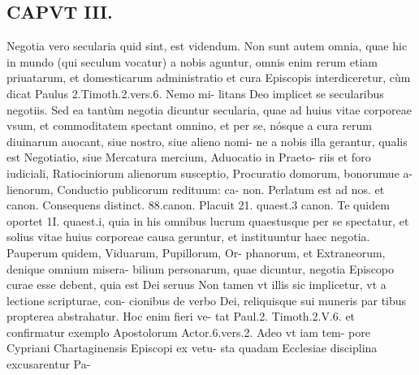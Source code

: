 \documentclass{article}
\begin{document}
\begin{pages}
\section*{CAPVT  III. }
\marginpar{[ p.149 ]}\pstart Negotia vero secularia quid sint, est videndum. Non sunt autem omnia, quae hic in mundo (qui seculum vocatur) a nobis aguntur, omnis enim rerum etiam priuatarum, et domesticarum administratio et cura Episcopis interdiceretur, cùm dicat Paulus 2.Timoth.2.vers.6. Nemo mi- litans Deo implicet se secularibus negotiis. Sed ea tantùm negotia dicuntur secularia, quae ad huius vitae corporeae vsum, et commoditatem spectant omnino, et per se, nósque a cura rerum diuinarum auocant, siue nostro, siue alieno nomi- ne a nobis illa gerantur, qualis est Negotiatio, siue Mercatura mercium, Aduocatio in Praeto- riis et foro iudiciali, Ratiociniorum alienorum susceptio, Procuratio domorum, bonorumue a- lienorum, Conductio publicorum redituum: ca- non. Perlatum est ad nos. et canon. Consequens distinct. 88.canon. Placuit 21. quaest.3 canon. Te quidem oportet 1I. quaest.i, quia in his omnibus lucrum quaestusque per se spectatur, et solius vitae huius corporeae causa geruntur, et instituuntur haec negotia.  \pend\pstart Pauperum quidem, Viduarum, Pupillorum, Or- phanorum, et Extraneorum, denique omnium misera- bilium personarum, quae dicuntur, negotia Episcopo curae esse debent, quia est Dei seruus Non tamen vt illis sic implicetur, vt a lectione scripturae, con- cionibus de verbo Dei, reliquisque  sui muneris par tibus propterea abstrahatur. Hoc enim fieri ve- tat Paul.2. Timoth.2.V.6. et confirmatur exemplo Apostolorum Actor.6.vers.2. Adeo vt iam tem- pore Cypriani Chartaginensis Episcopi ex vetu- sta quadam Ecclesiae disciplina excusarentur Pa-  \pend

\end{pages}
\end{document}
